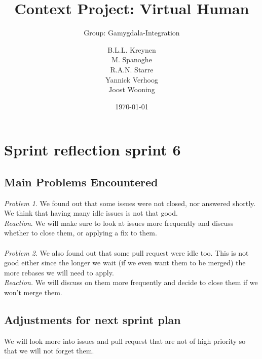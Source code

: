 \documentclass{scrartcl}
\begin{document}
\title{Context Project: Virtual Human}
\subtitle{Group: Gamygdala-Integration}
\date{\today{}}

\author{
    \begin{tabular}{l r}
      B.L.L. Kreynen\\
      M. Spanoghe\\
      R.A.N. Starre\\
      Yannick Verhoog\\
      Joost Wooning\\
    \end{tabular}
}

\maketitle \thispagestyle{empty} \pagebreak

\section{Sprint reflection sprint 6}

\subsection{Main Problems Encountered}

\emph{Problem 1}. We found out that some issues were not closed, nor answered shortly. We think that having many idle issues is not that good.\\
\emph{Reaction}. We will make sure to look at issues more frequently and discuss whether to close them, or applying a fix to them.\\ 
\\
\emph{Problem 2}. We also found out that some pull request were idle too. This is not good either since the longer we wait (if we even want them to be merged) the more rebases we will need to apply. \\
\emph{Reaction.} We will discuss on them more frequently and decide to close them if we won't merge them.
\\

\subsection{Adjustments for next sprint plan}
We will look more into issues and pull request that are not of high priority so that we will not forget them.
\end{document}
